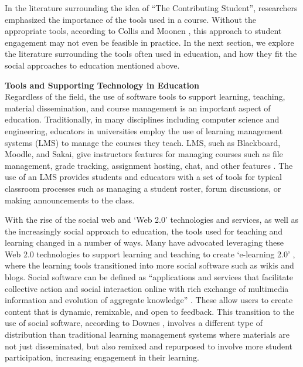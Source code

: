 In the literature surrounding the idea of ``The Contributing Student'', researchers emphasized the importance of the tools used in a course. Without the appropriate tools, according to Collis and Moonen \cite{collis2006contributing}, this approach to student engagement may not even be feasible in practice. In the next section, we explore the literature surrounding the tools often used in education, and how they fit the social approaches to education mentioned above.

\textbf{Tools and Supporting Technology in Education} \\
Regardless of the field, the use of software tools to support learning, teaching, material dissemination, and course management is an important aspect of education. Traditionally, in many disciplines including computer science and engineering, educators in universities employ the use of learning management systems (LMS) to manage the courses they teach. LMS, such as Blackboard, Moodle, and Sakai, give instructors features for managing courses such as file management, grade tracking, assignment hosting, chat, and other features \cite{kumar2011comparative}. The use of an LMS provides students and educators with a set of tools for typical classroom processes such as managing a student roster, forum discussions, or making announcements to the class.

With the rise of the social web and ‘Web 2.0’ technologies and services, as well as the increasingly social approach to education, the tools used for teaching and learning changed in a number of ways. Many have advocated leveraging these Web 2.0 technologies to support learning and teaching to create ‘e-learning 2.0’ \cite{downes2005feature}, where the learning tools transitioned into more social software such as wikis and blogs. Social software can be defined as ``applications and services that facilitate collective action and social interaction online with rich exchange of multimedia information and evolution of aggregate knowledge'' \cite{parameswaran2007social}. These allow users to create content that is dynamic, remixable, and open to feedback. This transition to the use of social software, according to Downes \cite{downes2005feature}, involves a different type of distribution than traditional learning management systems where materials are not just disseminated, but also remixed and repurposed to involve more student participation, increasing engagement in their learning.


